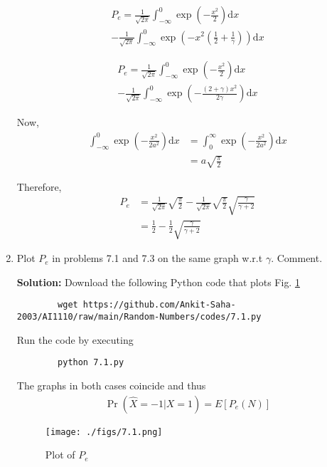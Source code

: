 \documentclass[journal,12pt,twocolumn]{IEEEtran}
\newcommand{\solution}{\noindent \textbf{Solution: }}
\providecommand{\pr}[1]{\ensuremath{\Pr\left(#1\right)}}
\providecommand{\brak}[1]{\ensuremath{\left(#1\right)}}
\providecommand{\mean}[1]{E\left[ #1 \right]}
\providecommand{\der}[1]{\mathrm{d} #1}
\numberwithin{equation}{section}
\renewcommand\thesection{\arabic{section}}
\begin{document}
\begin{enumerate}[label=\thesection.\arabic*,ref=\thesection.\theenumi]
	\begin{multline}
		P_e = \frac{1}{\sqrt{2\pi}} \int_{-\infty}^{0} \exp\brak{-\frac{x^2}{2}} \der{x} \\
		- \frac{1}{\sqrt{2\pi}} \int_{-\infty}^{0}  \exp\brak{-x^2\brak{\frac{1}{2} + \frac{1}{\gamma}}} \der{x}
	\end{multline}
	
	\begin{multline}
		P_e = \frac{1}{\sqrt{2\pi}} \int_{-\infty}^{0} \exp\brak{-\frac{x^2}{2}} \der{x} \\
		- \frac{1}{\sqrt{2\pi}} \int_{-\infty}^{0}  \exp\brak{-\frac{(2+\gamma) x^2}{2\gamma} } \der{x}
	\end{multline}
	
	Now,
	\begin{align}
		\int_{-\infty}^{0} \exp\brak{-\frac{x^2}{2a^2}} \der{x} &= \int_{0}^{\infty} \exp\brak{-\frac{x^2}{2a^2}} \der{x} \\
		 &= a \sqrt{\frac{\pi}{2}}
	\end{align}
	
	Therefore,
	\begin{align}
		P_e &= \frac{1}{\sqrt{2\pi}} \sqrt{\frac{\pi}{2}} - \frac{1}{\sqrt{2\pi}} \sqrt{\frac{\pi}{2}} \sqrt{\frac{\gamma}{\gamma+2}} \\
		&= \frac{1}{2} - \frac{1}{2} \sqrt{\frac{\gamma}{\gamma+2}}
	\end{align}
	
	\item Plot $P_e$ in problems 7.1 and 7.3 on the same graph w.r.t $\gamma$.  Comment.
	
	\solution Download the following Python code that plots Fig. \ref{fig-7.4} 
	\begin{lstlisting}
		wget https://github.com/Ankit-Saha-2003/AI1110/raw/main/Random-Numbers/codes/7.1.py
	\end{lstlisting}
	Run the code by executing
	\begin{lstlisting}
		python 7.1.py
	\end{lstlisting}
	
	The graphs in both cases coincide and thus
	\begin{align}
		\pr{\hat{X} = -1|X = 1} = \mean{P_e(N)}
	\end{align}
	
	\begin{figure}
		\centering
		\texttt{[image: ./figs/7.1.png]}
		\caption{Plot of $P_e$}
		\label{fig-7.4}
	\end{figure}
	\end{enumerate}
	
\end{document}

